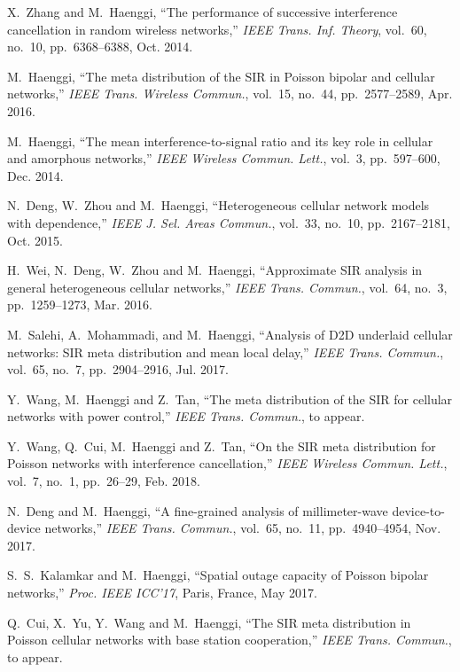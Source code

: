 \documentclass[12pt,draftclsnofoot,journal,onecolumn]{IEEEtran}
\begin{document}
\begin{thebibliography}{10}
	X.~Zhang and M.~Haenggi, ``{The performance of successive interference cancellation in random wireless networks},'' {\em IEEE Trans. Inf. Theory}, vol.~60, no.~10, pp.~6368--6388, Oct. 2014.
	
	M.~Haenggi, ``{The meta distribution of the SIR in Poisson bipolar and cellular networks},'' {\em IEEE Trans. Wireless Commun.}, vol.~15, no.~44, pp.~2577--2589, Apr. 2016.

	M.~Haenggi, ``{The mean interference-to-signal ratio and its key role in
	cellular and amorphous networks},'' {\em IEEE Wireless Commun.
	Lett.}, vol.~3, pp.~597--600, Dec. 2014.			
		
	N.~Deng, W.~Zhou and M.~Haenggi, ``{Heterogeneous cellular network models with dependence},'' {\em IEEE J. Sel. Areas Commun.}, vol.~33, no.~10, pp.~2167--2181, Oct. 2015.	
		
	H.~Wei, N.~Deng, W.~Zhou and M.~Haenggi, ``{Approximate SIR analysis in general heterogeneous cellular networks},'' {\em IEEE Trans. Commun.}, vol.~64, no.~3, pp.~1259--1273, Mar. 2016.	
	
	M.~Salehi, A.~Mohammadi, and M.~Haenggi, ``{Analysis of D2D underlaid cellular networks: 
	SIR meta distribution and mean local delay},'' {\em IEEE Trans. Commun.}, vol.~65, no.~7, pp.~2904--2916, Jul. 2017.
	
	Y.~Wang, M.~Haenggi and Z.~Tan, ``{The meta distribution of the SIR for cellular networks with power control},'' {\em IEEE Trans. Commun.}, to appear.
	
	Y.~Wang, Q.~Cui, M.~Haenggi and Z.~Tan, ``{On the SIR meta distribution for Poisson networks with interference cancellation},'' {\em IEEE Wireless Commun. Lett.}, vol.~7, no.~1, pp.~26--29, Feb. 2018.

	N.~Deng and M.~Haenggi, ``{A fine-grained analysis of millimeter-wave device-to-device networks},'' {\em IEEE Trans. Commun.}, vol.~65, no.~11, pp.~4940--4954, Nov. 2017.	
	
	S.~S.~Kalamkar and M.~Haenggi, ``{Spatial outage capacity of Poisson bipolar networks},'' {\em Proc. IEEE ICC'17}, Paris, France, May 2017.	
	
	Q.~Cui, X.~Yu, Y.~Wang and M.~Haenggi, ``{The SIR meta distribution in Poisson cellular networks with base station cooperation},'' {\em IEEE Trans. Commun.}, to appear.	
	

\end{thebibliography}
\end{document}
